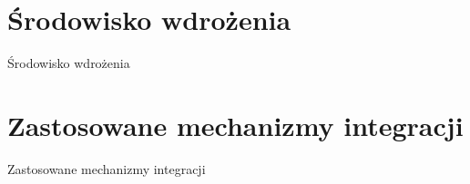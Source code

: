 
\section{Środowisko wdrożenia}
\label{sec:srodowiskoWdrozenia}

Środowisko wdrożenia


\section{Zastosowane mechanizmy integracji}
\label{sec:integracja}

Zastosowane mechanizmy integracji

